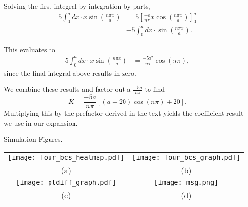 \documentclass[reprint, amsmath, amssymb, aps, floatfix]{revtex4-1}
\begin{document}
Solving the first integral by integration by parts, \begin{equation}
\begin{aligned}
5\int_0^a dx\cdot x\sin\left(\frac{n\pi x}{a}\right) &= 5\left[\frac{-a}{n\pi}x\cos\left(\frac{n\pi x}{a}\right)\right]_0^a \\ &- 5\int_0^a dx\cdot \sin\left(\frac{n\pi x}{a}\right).
\end{aligned}
\end{equation} 

This evaluates to \begin{equation}
\begin{aligned}
5\int_0^a dx\cdot x\sin\left(\frac{n\pi x}{a}\right) &= \frac{-5a^2}{n\pi}\cos(n\pi),
\end{aligned}
\end{equation} since the final integral above results in zero.

We combine these results and factor out a $\frac{-5a}{n\pi}$ to find \begin{equation}
K = \frac{-5a}{n\pi}\left[(a-20)\cos(n\pi)+20\right].
\end{equation} Multiplying this by the prefactor derived in the text yields the coefficient result we use in our expansion.





\clearpage

\begin{table*}[t]
	{\large \sc Simulation Figures.}\\
	\centering
	\begin{tabular}{cc}
		\texttt{[image: four\_bcs\_heatmap.pdf]}
		&
		\texttt{[image: four\_bcs\_graph.pdf]}\\ (a)&(b)\\
		
		\texttt{[image: ptdiff\_graph.pdf]} 
		&
		\texttt{[image: msg.png]} \\ (c)
		& (d)\\
	\end{tabular}
	\label{simfigs}
\end{table*}
\end{document}
